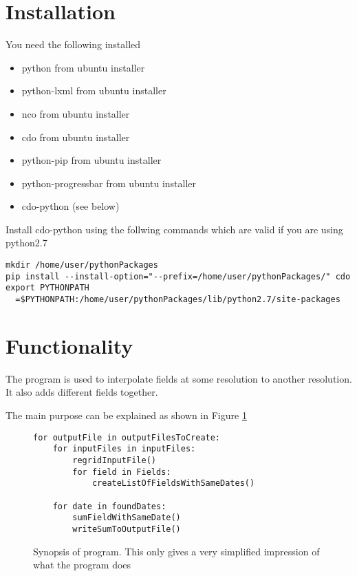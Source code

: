 \documentclass[12pt]{article}
\begin{document}
\lstset{language=Python}

\tableofcontents
\newpage

\section{Installation}

You need the following installed
\begin{itemize}
\item python from ubuntu installer
\item python-lxml from ubuntu installer
\item nco from ubuntu installer
\item cdo from ubuntu installer
\item python-pip from ubuntu installer
\item python-progressbar from ubuntu installer
\item cdo-python (see below)
\end{itemize}
Install cdo-python using the follwing commands which are valid if you are using python2.7
\begin{verbatim}
mkdir /home/user/pythonPackages
pip install --install-option="--prefix=/home/user/pythonPackages/" cdo
export PYTHONPATH
  =$PYTHONPATH:/home/user/pythonPackages/lib/python2.7/site-packages
\end{verbatim}


\section{Functionality}

The program is used to interpolate fields at some resolution to another resolution. 
It also adds different fields together.

The main purpose can be explained as shown in Figure \ref{fgr:synopsis}

\begin{figure}[htb]
\begin{lstlisting}
for outputFile in outputFilesToCreate:
	for inputFiles in inputFiles:
		regridInputFile()
		for field in Fields:
			createListOfFieldsWithSameDates()

	for date in foundDates:
		sumFieldWithSameDate()
		writeSumToOutputFile()
\end{lstlisting}
\caption{Synopsis of program. This only gives a very simplified impression of what the program does \label{fgr:synopsis}}
\end{figure}
\end{document}
